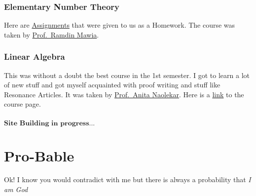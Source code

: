 \documentclass[
  letterpaper,
  DIV=11,
  numbers=noendperiod]{scrreprt}
\begin{document}
\begin{tcolorbox}[enhanced jigsaw, breakable, rightrule=.15mm, opacityback=0, arc=.35mm, colframe=quarto-callout-important-color-frame, colback=white, toprule=.15mm, left=2mm, bottomrule=.15mm, leftrule=.75mm]
\subsection*{Elementary Number Theory}\label{elementary-number-theory}

Here are
\href{https://drive.google.com/file/d/1a-w8kH7kZud-1WypK9IrwDW7UoYUFmZf/view?usp=sharing}{Assignments}
that were given to us as a Homework. The course was taken by
\href{https://sites.google.com/view/ramdinmawia/home}{Prof.~Ramdin
Mawia}.

\subsection*{Linear Algebra}\label{linear-algebra}

This was without a doubt the best course in the 1st semester. I got to
learn a lot of new stuff and got myself acquainted with proof writing
and stuff like Resonance Articles. It was taken by
\href{https://www.isibang.ac.in/~statmath/homepage.html}{Prof.~Anita
Naolekar}. Here is a
\href{https://www.isibang.ac.in/~adean/infsys/database/Bmath/LAlg1.html}{link}
to the course page.

\subsection*{}\label{section}

\(\textbf{Site Building in progress...}\)

\end{tcolorbox}


\chapter*{Pro-Bable}\label{pro-bable}


Ok! I know you would contradict with me but there is always a
probability that \emph{I am God}

\hfill\break
\end{document}
